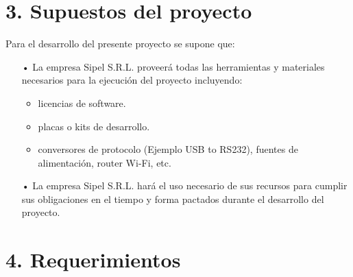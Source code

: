 \documentclass[11pt]{charter}
\begin{document}
\section{3. Supuestos del proyecto}
\label{sec:supuestos}


Para el desarrollo del presente proyecto se supone que:

\begin{itemize}
\item[•] La empresa Sipel S.R.L. proveerá todas las herramientas y materiales necesarios para la ejecución del proyecto incluyendo:
	\begin{itemize}
	\item licencias de software.
	\item placas o kits de desarrollo.
	\item conversores de protocolo (Ejemplo USB to RS232), fuentes de alimentación, router Wi-Fi, etc.
	\end{itemize}
\item[•] La empresa Sipel S.R.L. hará el uso necesario de sus recursos para cumplir sus obligaciones en el tiempo y forma pactados durante el desarrollo del proyecto.
\end{itemize}



\section{4. Requerimientos}
\label{sec:requerimientos}
\end{document}
